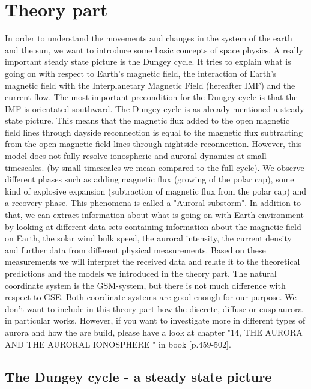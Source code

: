 \documentclass[10pt,a4paper]{article}
\begin{document}
\section{Theory part} 
In order to understand the movements and changes in the system of the earth and the sun, we want to introduce some basic concepts of space physics.
A really important steady state picture is the Dungey cycle. It tries to explain what is going on with respect to Earth's magnetic field, the interaction of Earth's
magnetic field with the Interplanetary Magnetic Field (hereafter IMF) and the current flow. The most important precondition for the Dungey cycle is that the IMF is orientated southward. The Dungey cycle is as already mentioned a steady state picture. This means that the magnetic flux added to the open magnetic field lines through dayside reconnection is equal to the magnetic flux subtracting from the open magnetic field lines through nightside reconnection. However, this model does not fully resolve ionospheric and auroral dynamics at small timescales. 
(by small timescales we mean compared to the full cycle). We observe different phases such as adding magnetic flux (growing of the polar cap), some kind of explosive expansion 
(subtraction of magnetic flux from the polar cap) and a recovery phase. This phenomena is called a "Auroral substorm". In addition to that, we can extract information 
about what is going on with Earth environment by looking at different data sets containing information about the magnetic field on Earth, the solar wind bulk speed, 
the auroral intensity, the current density and further data from different physical measurements. Based on these measurements we will interpret the received data and relate 
it to the theoretical predictions and the models we introduced in the theory part. The natural coordinate system is the GSM-system, but there is not much difference with respect to GSE. Both coordinate systems are good enough for our purpose. 
We don't want to include in this theory part how the discrete, diffuse or cusp aurora in particular works. However, if you want to investigate more in different types of aurora and how the are build, please have a look at chapter "14, THE AURORA AND THE AURORAL IONOSPHERE " in book \cite{Buch2}[p.459-502]. 

\subsection{The Dungey cycle - a steady state picture \label{_CHAP_THEO_Dungey cycle}}
\end{document}
